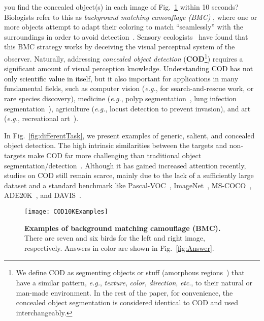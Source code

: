 \documentclass[10pt,journal,compsoc]{IEEEtran}
\def\eg{\emph{e.g.}}
\def\etc{\emph{etc}}
\newcommand{\figref}[1]{Fig.~\ref{#1}}
\newcommand{\Rev}[1]{\textcolor{black}{#1}}
\begin{document}
 you find the concealed object(s) in each image of 
\figref{fig:COD10KExample} within 10 seconds? 
%
Biologists refer to this as \emph{background matching camouflage (BMC)}
\cite{cuthill2005disruptive}, 
where one or more objects attempt to adapt their coloring to match 
``seamlessly'' with the surroundings in order 
to avoid detection~\cite{owens2014camouflaging}.
%
Sensory ecologists~\cite{stevens2008animal} have found that this BMC strategy 
works by deceiving the visual perceptual system of the observer.
%
Naturally, addressing \emph{concealed object detection} 
(\textbf{COD}\footnote{We define COD as segmenting objects or stuff 
(amorphous regions~\cite{kirillov2019panoptic}) 
that have a similar pattern, \eg, \emph{texture}, \emph{color}, 
\emph{direction}, \etc., to their natural or man-made environment. 
In the rest of the paper, for convenience, the concealed object segmentation 
is considered identical to COD and used interchangeably.}) 
requires a significant amount of visual perception
\cite{troscianko2008camouflage} knowledge.
%
\Rev{Understanding COD has not only scientific value in itself,} but it also 
important for applications in many fundamental fields, 
such as computer vision 
(\eg, for search-and-rescue work, or rare species discovery), 
medicine (\eg, polyp segmentation~\cite{fan2020pranet}, 
lung infection segmentation~\cite{fan2020inf}), 
agriculture (\eg, locust detection to prevent invasion), 
and art (\eg, recreational art~\cite{chu2010camouflage}).


In \figref{fig:differentTask}, we present examples of generic, salient, 
and concealed object detection.
%
The high intrinsic similarities between the targets and non-targets make 
COD far more challenging than traditional object segmentation/detection~\cite{zhao2019object,Fan2021SOC,zhao2019EGNet}.
%
Although it has gained increased attention recently, 
studies on COD still remain scarce, 
mainly due to the lack of a sufficiently large dataset and a standard benchmark
like Pascal-VOC~\cite{everingham2010pascal}, 
ImageNet~\cite{deng2009imagenet}, MS-COCO~\cite{lin2014microsoft}, 
ADE20K~\cite{zhou2017scene}, and DAVIS~\cite{perazzi2016benchmark}.

\begin{figure}[t!]
  \centering
  \texttt{[image: COD10KExamples]}\\
  \vspace{-8pt}
  \caption{\textbf{Examples of background matching camouflage (BMC).} 
    There are seven and six birds for the left and right image, respectively. 
    Answers in color are shown in \figref{fig:Answer}.
  }\label{fig:COD10KExample}
\end{figure}
\end{document}
